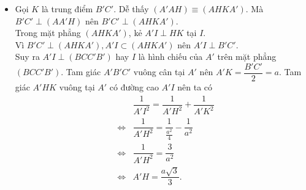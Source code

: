 \begin{ex}
{\begin{itemize}
   Vậy hình chiếu của tam giác $A'AB$ trên mặt phẳng $(ABC)$ chính  là tam giác $ABH$.\\
   Tam giác $ABC$ vuông cân tại $A$ có $B  C=2 a \Rightarrow AB=AC=a \sqrt{2}$.\\
   Diện tích tam  giác $ABH$ là
   $$ 
   S_{\triangle ABH}=\frac{1}{2} S_{A B C}=\frac{1}{2} \cdot \frac{1}{2} A  B \cdot A C=\frac{1}{4}(a \sqrt{2})^2=\frac{a^2}{2}.
   $$ 
   \item Gọi $K$ là trung điểm $B'  C'$. Dễ thấy $\left(A'AH\right) \equiv\left(AHKA'\right)$.
   Mà $B'C'  \perp\left(AA' H\right)$ nên $B'C' \perp\left(AHKA'\right)$.\\
   Trong mặt phẳng $\left(AHKA'\right)$, kẻ $A'I  \perp HK$ tại $I$.\\
   Vì $B' C' \perp\left(AHKA'\right), A' I \subset\left(AHKA'\right)$ nên $A' I \perp B'C'$.\\ 
   Suy ra $A'I \perp\left(BCC'B'\right)$ hay $I$ là hình chiếu của $A'$ trên mặt  phẳng $\left(BCC'B'\right)$.
   Tam giác $A'B'C'$ vuông  cân tại $A'$ nên $A'K=\dfrac{B'C'}{2}=a$.
   Tam giác $A'H K$  vuông tại $A'$ có đường cao $A'I$ nên ta có
   \begin{eqnarray*}
    &&\dfrac{1}{A'I^2} = \dfrac{1}{A'  H^2}+\dfrac{1}{A' K^2}\\
     &\Leftrightarrow&\dfrac{1}{A' H^2}= \dfrac{1}{\tfrac{a^2}{4}}-\dfrac{1}{a^2}\\
     &\Leftrightarrow&\dfrac{1}{A'H^2}=\dfrac{3}{a^2}\\
    &\Leftrightarrow& A'H =\dfrac{a \sqrt{3}}{3}. 
   \end{eqnarray*}
  \end{itemize}
  }
\end{ex}

